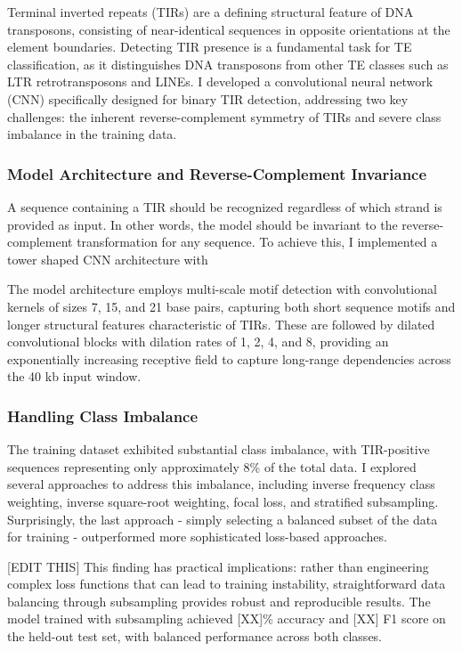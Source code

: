 \documentclass[12pt]{article}
\begin{document}
Terminal inverted repeats (TIRs) are a defining structural feature of DNA transposons, consisting of near-identical sequences in opposite orientations at the element boundaries. Detecting TIR presence is a fundamental task for TE classification, as it distinguishes DNA transposons from other TE classes such as LTR retrotransposons and LINEs. I developed a convolutional neural network (CNN) specifically designed for binary TIR detection, addressing two key challenges: the inherent reverse-complement symmetry of TIRs and severe class imbalance in the training data.

\subsubsection{Model Architecture and Reverse-Complement Invariance}



A sequence containing a TIR should be recognized regardless of which strand is provided as input. In other words, the model should be invariant to the reverse-complement transformation for any sequence. To achieve this, I implemented a tower shaped CNN architecture with

The model architecture employs multi-scale motif detection with convolutional kernels of sizes 7, 15, and 21 base pairs, capturing both short sequence motifs and longer structural features characteristic of TIRs. These are followed by dilated convolutional blocks with dilation rates of 1, 2, 4, and 8, providing an exponentially increasing receptive field to capture long-range dependencies across the 40 kb input window.

\subsubsection{Handling Class Imbalance}

The training dataset exhibited substantial class imbalance, with TIR-positive sequences representing only approximately 8\% of the total data. I explored several approaches to address this imbalance, including inverse frequency class weighting, inverse square-root weighting, focal loss, and stratified subsampling. Surprisingly, the last approach - simply selecting a balanced subset of the data for training - outperformed more sophisticated loss-based approaches.

[EDIT THIS] This finding has practical implications: rather than engineering complex loss functions that can lead to training instability, straightforward data balancing through subsampling provides robust and reproducible results. The model trained with subsampling achieved [XX]\% accuracy and [XX] F1 score on the held-out test set, with balanced performance across both classes.
\end{document}

